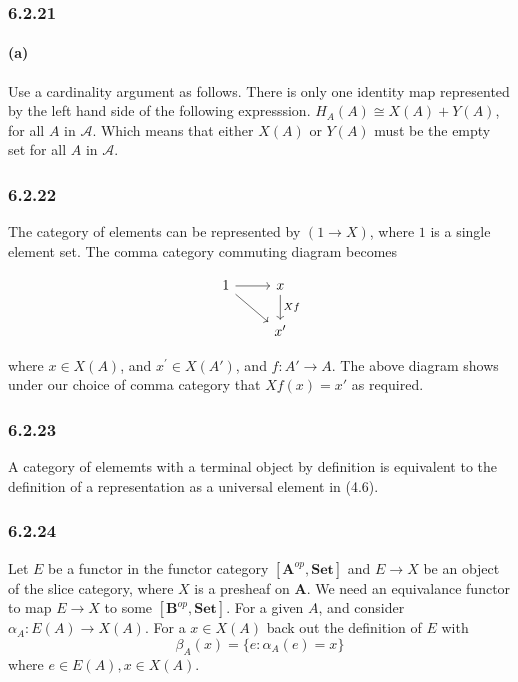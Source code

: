 \documentclass{article}
\begin{document}
\subsubsection*{6.2.21}

\paragraph{(a)}

Use a cardinality argument as follows. There is only one identity map represented by the left hand side of the following expresssion. $H_A(A) \cong X(A) + Y(A)$, for all $A$ in $\mathcal{A}$. Which means that either $X(A)$ or $Y(A)$ must be the empty set for all $A$ in $\mathcal{A}$.

\subsubsection*{6.2.22}

The category of elements can be represented by $(1 \rightarrow X)$, where $1$ is a single element set. The comma category commuting diagram becomes

\begin{equation}
\begin{tikzcd}
1 \arrow{r} \arrow{rd}
  & x \arrow{d}{Xf} \\
    & x^{\prime}
  \end{tikzcd}
\end{equation}

where $x \in X(A)$, and $x^{\prime} \in X(A')$, and $f: A' \rightarrow A$. The above diagram shows under our choice of comma category that $Xf(x) = x'$ as required.

\subsubsection*{6.2.23}

A category of elememts with a terminal object by definition is equivalent to the definition of a representation as a universal element in (4.6).

\subsubsection*{6.2.24}

Let $E$ be a functor in the functor category $\left[\mathbf{A}^{op}, \mathbf{Set}\right]$ and $E \rightarrow X$ be an object of the slice category, where $X$ is a presheaf on $\mathbf{A}$. We need an equivalance functor to map $E \rightarrow X$ to some $\left[\mathbf{B}^{op}, \mathbf{Set}\right]$. For a given $A$, and consider $\alpha_A: E(A) \rightarrow X(A)$. For a $x \in  X(A)$  back out the definition of $E$ with
\begin{equation}
\label{eqn:6224}
  \beta_A(x) = \{e : \alpha_A(e) = x  \}
\end{equation}
where $e \in E(A), x \in X(A)$.
\end{document}
